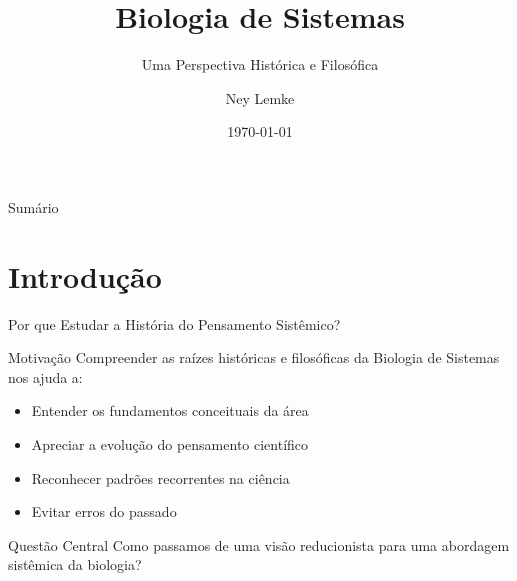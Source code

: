 


\title[História e Filosofia]{Biologia de Sistemas}
\subtitle{Uma Perspectiva Histórica e Filosófica}
\author{Ney Lemke}
\date{\today}



\begin{frame}
\titlepage
\end{frame}

\begin{frame}{Sumário}
\tableofcontents
\end{frame}

\section{Introdução}

\begin{frame}{Por que Estudar a História do Pensamento Sistêmico?}
\begin{block}{Motivação}
Compreender as raízes históricas e filosóficas da Biologia de Sistemas nos ajuda a:
\begin{itemize}
    \item Entender os fundamentos conceituais da área
    \item Apreciar a evolução do pensamento científico
    \item Reconhecer padrões recorrentes na ciência
    \item Evitar erros do passado
\end{itemize}
\end{block}

\vspace{0.5cm}

\begin{exampleblock}{Questão Central}
Como passamos de uma visão reducionista para uma abordagem sistêmica da biologia?
\end{exampleblock}
\end{frame}

